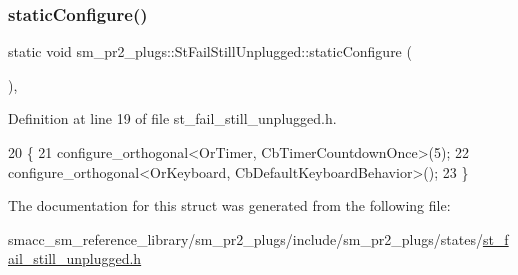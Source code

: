\subsubsection{\texorpdfstring{static\+Configure()}{staticConfigure()}}
{\footnotesize\ttfamily static void sm\+\_\+pr2\+\_\+plugs\+::\+St\+Fail\+Still\+Unplugged\+::static\+Configure (\begin{DoxyParamCaption}{ }\end{DoxyParamCaption})\hspace{0.3cm}{\ttfamily [inline]}, {\ttfamily [static]}}



Definition at line 19 of file st\+\_\+fail\+\_\+still\+\_\+unplugged.\+h.


\begin{DoxyCode}
20     \{
21         configure\_orthogonal<OrTimer,  CbTimerCountdownOnce>(5);    
22         configure\_orthogonal<OrKeyboard, CbDefaultKeyboardBehavior>();
23     \}
\end{DoxyCode}


The documentation for this struct was generated from the following file\+:\begin{DoxyCompactItemize}
\item 
smacc\+\_\+sm\+\_\+reference\+\_\+library/sm\+\_\+pr2\+\_\+plugs/include/sm\+\_\+pr2\+\_\+plugs/states/\hyperlink{st__fail__still__unplugged_8h}{st\+\_\+fail\+\_\+still\+\_\+unplugged.\+h}\end{DoxyCompactItemize}
